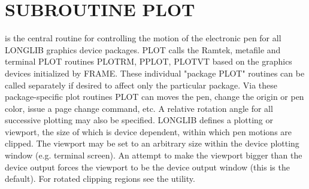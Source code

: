 \documentclass[11pt]{report}
\begin{document}
\section{SUBROUTINE PLOT}

 is the central routine for controlling the motion of the electronic
pen for all LONGLIB graphics device packages.  PLOT calls the Ramtek,
metafile and terminal PLOT routines PLOTRM, PPLOT, PLOTVT based on the
graphics devices initialized by FRAME.  These individual "package
PLOT" routines can be called separately if desired to affect only the
particular package.  Via these package-specific plot routines PLOT can
moves the pen, change the origin or pen color, issue a page change
command, etc.  A relative rotation angle for all successive plotting
may also be specified.  LONGLIB defines a plotting  or
viewport, the size of which is device dependent, within which pen
motions are clipped.  The viewport may be set to an arbitrary size
within the device plotting window (e.g. terminal screen).  An attempt
to make the viewport bigger than the device output forces the viewport
to be the device output window (this is the default).  For rotated
clipping regions see the  utility.
\end{document}
